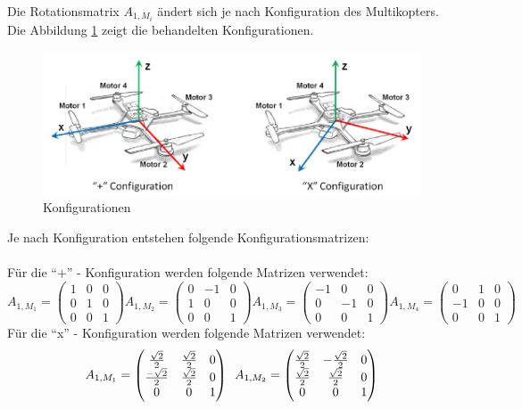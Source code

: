 Die Rotationsmatrix $A_{1, M_i}$ ändert sich je nach Konfiguration des Multikopters. Die Abbildung \ref{fig:Konfigurationen} zeigt die behandelten Konfigurationen.
\begin{figure}[ht]
  \centering
  \includegraphics{images/Konfigurationen.pdf}
  \caption{Konfigurationen}
  \label{fig:Konfigurationen}
\end{figure}
Je nach Konfiguration entstehen folgende Konfigurationsmatrizen:\\\\
Für die ``+'' - Konfiguration werden folgende Matrizen verwendet:
\[
  A_{1, M_1} = \begin{pmatrix} 1 & 0 & 0 \\ 0 & 1 & 0 \\ 0 & 0 & 1 \end{pmatrix}
  A_{1, M_2} = \begin{pmatrix} 0 & -1 & 0 \\ 1 & 0 & 0 \\ 0 & 0 & 1 \end{pmatrix}
  A_{1, M_3} = \begin{pmatrix} -1 & 0 & 0 \\ 0 & -1 & 0 \\ 0 & 0 & 1 \end{pmatrix} 
  A_{1, M_4} = \begin{pmatrix} 0 & 1 & 0 \\ -1 & 0 & 0 \\ 0 & 0 & 1 \end{pmatrix}
\] \label{sec:konfg_matrix}
Für die ``x'' - Konfiguration werden folgende Matrizen verwendet:
\[
  A_{1, M_1} = \begin{pmatrix} \frac{\sqrt{2}}{2} & \frac{\sqrt{2}}{2} & 0 \\ \frac{-\sqrt{2}}{2} & \frac{\sqrt{2}}{2} & 0 \\ 0 & 0 & 1 \end{pmatrix} \hspace{0.5em}
  A_{1, M_2} = \begin{pmatrix} \frac{\sqrt{2}}{2} & -\frac{\sqrt{2}}{2} & 0 \\ \frac{\sqrt{2}}{2} & \frac{\sqrt{2}}{2} & 0 \\ 0 & 0 & 1 \end{pmatrix}
\]
